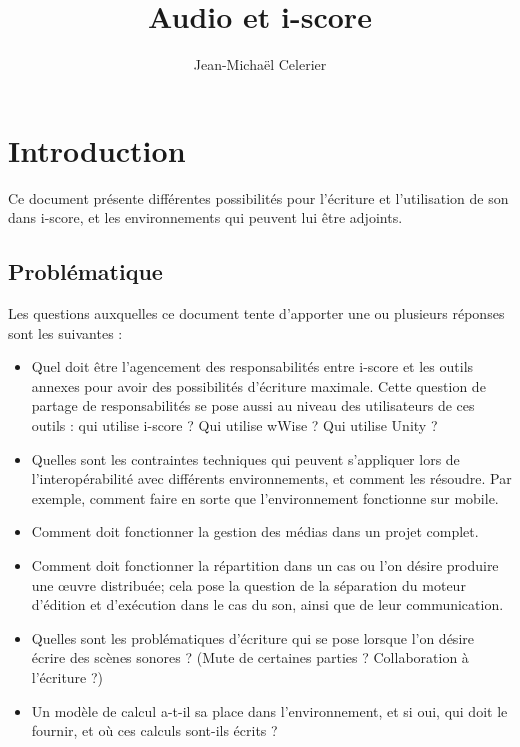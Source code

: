 \documentclass[french,12pt,a4paper]{article}
\title{Audio et i-score}
\author{Jean-Michaël Celerier}
\begin{document}
\maketitle

\section{Introduction}
Ce document présente différentes possibilités 
pour l'écriture et l'utilisation de son dans i-score, 
et les environnements qui peuvent lui être adjoints.

\subsection{Problématique}
Les questions auxquelles ce document tente d'apporter une ou plusieurs réponses sont les suivantes : 
\begin{itemize}
    \item Quel doit être l'agencement des responsabilités entre i-score et les outils annexes pour avoir des possibilités d'écriture maximale.
    Cette question de partage de responsabilités se pose aussi au niveau des utilisateurs de ces outils : qui utilise i-score ? Qui utilise wWise ? Qui utilise Unity ? 
    \item Quelles sont les contraintes techniques qui peuvent s'appliquer lors de l'interopérabilité avec différents environnements, et comment les résoudre. 
    Par exemple, comment faire en sorte que l'environnement fonctionne sur mobile.
    \item Comment doit fonctionner la gestion des médias dans un projet complet.
    \item Comment doit fonctionner la répartition dans un cas ou l'on désire produire une \oe uvre distribuée; cela pose la question de la séparation du moteur d'édition et d'exécution dans le cas du son, ainsi que de leur communication.
    \item Quelles sont les problématiques d'écriture qui se pose lorsque l'on désire écrire des scènes sonores ? (Mute de certaines parties ? Collaboration à l'écriture ?)
    \item Un modèle de calcul a-t-il sa place dans l'environnement, et si oui, qui doit le fournir, et où ces calculs sont-ils écrits ?
\end{itemize}

\end{document}
